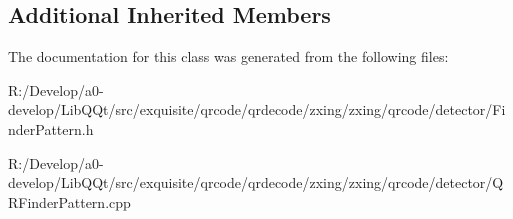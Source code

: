 \subsection*{Additional Inherited Members}


The documentation for this class was generated from the following files\+:\begin{DoxyCompactItemize}
\item 
R\+:/\+Develop/a0-\/develop/\+Lib\+Q\+Qt/src/exquisite/qrcode/qrdecode/zxing/zxing/qrcode/detector/Finder\+Pattern.\+h\item 
R\+:/\+Develop/a0-\/develop/\+Lib\+Q\+Qt/src/exquisite/qrcode/qrdecode/zxing/zxing/qrcode/detector/Q\+R\+Finder\+Pattern.\+cpp\end{DoxyCompactItemize}
